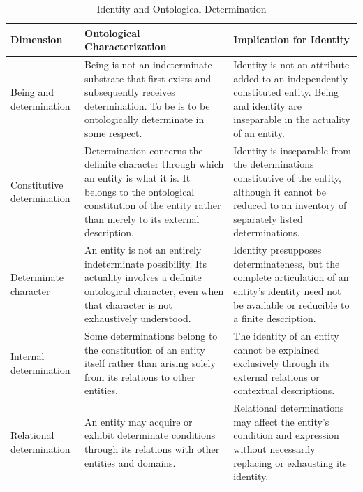 
\begin{table}[htbp]
    \centering
    \caption{Identity and Ontological Determination}
    \label{tab:identity-and-determination}

    \renewcommand{\arraystretch}{1.4}
    \begin{tabular}{p{3.2cm} p{5.1cm} p{5.3cm}}
        \hline
        \textbf{Dimension} &
        \textbf{Ontological Characterization} &
        \textbf{Implication for Identity} \\
        \hline

        Being and determination &
        Being is not an indeterminate substrate that first exists and subsequently receives determination. To be is to be ontologically determinate in some respect. &
        Identity is not an attribute added to an independently constituted entity. Being and identity are inseparable in the actuality of an entity. \\

        Constitutive determination &
        Determination concerns the definite character through which an entity is what it is. It belongs to the ontological constitution of the entity rather than merely to its external description. &
        Identity is inseparable from the determinations constitutive of the entity, although it cannot be reduced to an inventory of separately listed determinations. \\

        Determinate character &
        An entity is not an entirely indeterminate possibility. Its actuality involves a definite ontological character, even when that character is not exhaustively understood. &
        Identity presupposes determinateness, but the complete articulation of an entity's identity need not be available or reducible to a finite description. \\

        Internal determination &
        Some determinations belong to the constitution of an entity itself rather than arising solely from its relations to other entities. &
        The identity of an entity cannot be explained exclusively through its external relations or contextual descriptions. \\

        Relational determination &
        An entity may acquire or exhibit determinate conditions through its relations with other entities and domains. &
        Relational determinations may affect the entity's condition and expression without necessarily replacing or exhausting its identity. \\


\end{tabular}
\end{table}
